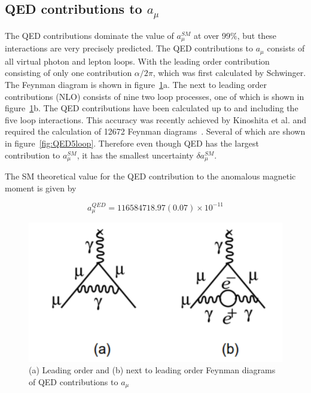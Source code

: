 \subsection{QED contributions to $a_{\mu}$}

The QED contributions dominate the value of $a_{\mu}^{SM}$ at over 99$\%$, but these interactions are very precisely predicted. 
The QED contributions to $a_{\mu}$ consists of all virtual photon and lepton \cite{Reference15} loops. With the leading order contribution consisting of only one contribution ${\alpha}/2{\pi}$, which was first calculated by Schwinger. The Feynman diagram is shown in figure~\ref{fig:QED_NO_NLO}a. The next to leading order contributions (NLO) consists of nine two loop processes, one of which is shown in figure~\ref{fig:QED_NO_NLO}b. The QED contributions have been calculated up to and including the five loop interactions. This accuracy was recently achieved by Kinoshita et al. and required the calculation of 12672 Feynman diagrams~\cite{Reference16,Reference17}. Several of which are shown in figure~\ref{fig:QED5loop}. Therefore even though QED has the largest contribution to $a_{\mu}^{SM}$, it has the smallest uncertainty ${\delta}a_{\mu}^{SM}$.

The SM theoretical value for the QED contribution to the anomalous magnetic moment is given by

\begin{equation}
a_{\mu}^{QED} = 116 584 718.97(0.07){\times}10^{-11}
\end{equation}

\begin{figure}[th]
\centering
\includegraphics[scale=0.6]{Figures/QED_LO_NLO}
\decoRule
\caption{(a) Leading order and (b) next to leading order Feynman diagrams of QED contributions to $a_{\mu}$}
\label{fig:QED_NO_NLO}
\end{figure}

